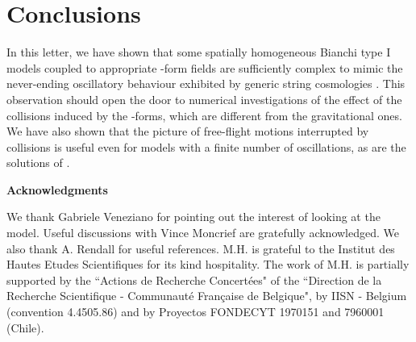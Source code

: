 \documentclass[a4paper,12pt]{article}
\begin{document}
\section{Conclusions}
In this letter, we have shown that some spatially homogeneous
Bianchi type I models coupled to appropriate \coordHE{}-form fields are
sufficiently complex to mimic the never-ending oscillatory behaviour
exhibited by generic string cosmologies \cite{dh1}.  This observation
 should open the door to numerical investigations of the effect
of the collisions induced by
the \coordHE{}-forms, which are different from the gravitational ones.  
We have also shown that the picture of free-flight motions
interrupted by collisions is useful even for models with a finite
number of oscillations, as are the solutions of \cite{MV}.

\bigskip

\centerline{\bf Acknowledgments} 

\medskip

We thank Gabriele Veneziano for pointing out the interest of looking at 
the \coordHE{} model. Useful discussions with Vince Moncrief are 
gratefully acknowledged. We also thank A. Rendall for useful references.
M.H. is grateful to the Institut des Hautes Etudes
Scientifiques for its kind hospitality. 
The work of M.H. is partially supported by the ``Actions de
Recherche Concert{\'e}es" of the ``Direction de la Recherche
Scientifique - Communaut{\'e} Fran{\c c}aise de Belgique", by
IISN - Belgium (convention 4.4505.86) and by
Proyectos FONDECYT 1970151 and 7960001 (Chile).   
\end{document}
